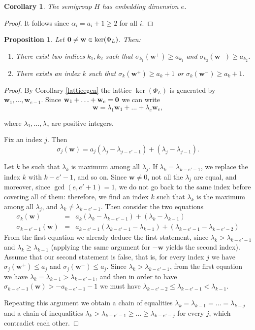 \documentclass[11pt,twoside]{amsart}
\def\bw{{\mathbf w}}
\newtheorem{prop}[Theorem]{Proposition}
\newtheorem{cor}[Theorem]{Corollary}
\theoremstyle{definition}
\numberwithin{equation}{section}
\begin{document}
\begin{cor}
The semigroup $H$ has embedding dimension $e$.
\end{cor}

\begin{proof}
It follows  since $\alpha_i = a_i+1 \ge 2$ for all $i$.
\end{proof}

\begin{prop}\label{lattice membership}
Let ${\bf 0} \ne \bw \in \ker(\Phi_L)$. Then:
\begin{enumerate}
\item There exist two indices $k_1,k_2$ such that $\sigma_{k_1}(\bw^+) \ge a_{k_1}$ and $\sigma_{k_2}(\bw^-) \ge a_{k_2}$.
\item There exists an index $k$ such that $\sigma_k(\bw^+) \ge a_k+1$ or $\sigma_k(\bw^-) \ge a_k+1$. 
\end{enumerate}

\end{prop}

\begin{proof}
By Corollary \ref{latticegen} the lattice $\ker(\Phi_L)$ is generated by $\bw_1,\ldots,\bw_{e-1}$. Since $\bw_1+\ldots+\bw_e={\bf 0}$ we can write
$$\bw=\lambda_1\bw_1+\ldots+\lambda_e\bw_e,$$

where $\lambda_1,\ldots,\lambda_e$ are positive integers.

Fix an index $j$. Then
$$\sigma_j(\bw)=a_j(\lambda_j-\lambda_{j-e'-1})+(\lambda_j-\lambda_{j-1}).$$

Let $k$ be such that $\lambda_k$ is maximum among all $\lambda_j$. If $\lambda_k=\lambda_{k-e'-1}$, we replace the index $k$ with $k-e'-1$, and so on. Since $\bw \ne 0$, not all the $\lambda_j$ are equal, and moreover, since $\gcd(e,e'+1)=1$, we do not go back to the same index before covering all of them: therefore, we find an index $k$ such that $\lambda_k$ is the maximum among all $\lambda_j$, and $\lambda_k \ne \lambda_{k-e'-1}$. Then consider the two equations
\begin{eqnarray}
\sigma_k(\bw) & = &a_k(\lambda_k-\lambda_{k-e'-1})+(\lambda_k-\lambda_{k-1}) \\
\sigma_{k-e'-1}(\bw) & = & a_{k-e'-1}(\lambda_{k-e'-1}-\lambda_{k-1})+(\lambda_{k-e'-1}-\lambda_{k-e'-2})
\end{eqnarray}
From the first equation we already deduce the first statement, since $\lambda_k > \lambda_{k-e'-1}$ and $\lambda_k \ge \lambda_{k-1}$ (applying the same argument for $-\bw$ yields the second index).
Assume that our second statement is false, that is, for every index $j$ we have $\sigma_j(\bw^+) \le a_j$ and $\sigma_j(\bw^-)\le a_j$. Since $\lambda_k > \lambda_{k-e'-1}$, from the first equation we have $\lambda_k = \lambda_{k-1} > \lambda_{k-e'-1}$, and then in order to have $\sigma_{k-e'-1}(\bw) > -a_{k-e'-1}-1$ we must have $\lambda_{k-e'-2} \le \lambda_{k-e'-1} < \lambda_{k-1}$.

Repeating this argument we obtain a chain of equalities $\lambda_k=\lambda_{k-1}=\ldots=\lambda_{k-j}$ and a chain of inequalities $\lambda_k > \lambda_{k-e'-1} \ge \ldots \ge \lambda_{k-e'-j}$ for every $j$, which contradict each other.
\end{proof}
\end{document}
